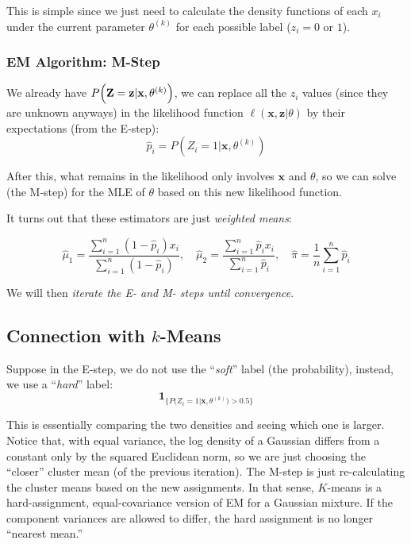 \documentclass[
]{book}
\begin{document}
This is simple since we just need to calculate the density functions of each \(x_i\) under the current parameter \(\theta^{(k)}\) for each possible label (\(z_i=0\) or \(1\)).

\subsubsection*{EM Algorithm: M-Step}\label{em-algorithm-m-step}

We already have \(P\Bigl(\mathbf{Z} = \mathbf{z}|\mathbf{x}, \theta^{(k)}\Bigr)\), we can replace all the \(z_i\) values (since they are unknown anyways) in the likelihood function \(\ell(\mathbf{x}, \mathbf{z}|\theta)\) by their expectations (from the E-step):
\[\hat{p}_i = P\left(Z_i=1|\mathbf{x}, \theta^{(k)}\right)\]

After this, what remains in the likelihood only involves \(\mathbf{x}\) and \(\theta\), so we can solve (the M-step) for the MLE of \(\theta\) based on this new likelihood function.

It turns out that these estimators are just \emph{weighted means}:

\[\hat{\mu}_1 = \frac{\sum_{i=1}^{n}(1-\hat{p}_i)x_i}{\sum_{i=1}^{n}(1-\hat{p}_i)},\quad
\hat{\mu}_2 = \frac{\sum_{i=1}^{n}\hat{p}_i x_i}{\sum_{i=1}^{n} \hat{p}_i},\quad
\hat{\pi} = \frac{1}{n}\sum_{i=1}^{n} \hat{p}_i \]

We will then \emph{iterate the E- and M- steps until convergence}.

\subsection*{\texorpdfstring{Connection with \(k\)-Means}{Connection with k-Means}}\label{connection-with-k-means}

Suppose in the E-step, we do not use the ``\emph{soft}'' label (the probability), instead, we use a ``\emph{hard}'' label:
\[\mathbf{1}_{\bigl\{P\bigl(Z_i = 1|\mathbf{x}, \theta^{(k)}\bigr) > 0.5\bigr\}}\]

This is essentially comparing the two densities and seeing which one is larger. Notice that, with equal variance, the log density of a Gaussian differs from a constant only by the squared Euclidean norm, so we are just choosing the ``closer'' cluster mean (of the previous iteration). The M-step is just re-calculating the cluster means based on the new assignments. In that sense, \(K\)-means is a hard-assignment, equal-covariance version of EM for a Gaussian mixture. If the component variances are allowed to differ, the hard assignment is no longer ``nearest mean.''
\end{document}
